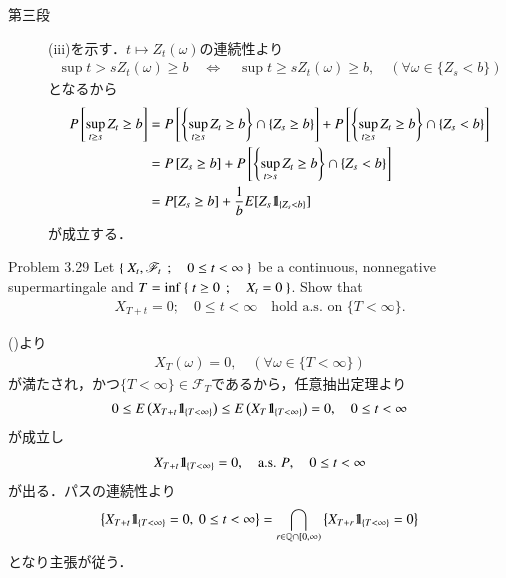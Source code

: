 \begin{prf}
\begin{description}
			\item[第三段]
				(iii)を示す．$t \longmapsto Z_t(\omega)$の連続性より
				\begin{align}
					\sup{t > s}{Z_t(\omega)} \geq b 
					\quad \Leftrightarrow \quad
					\sup{t \geq s}{Z_t(\omega)} \geq b,
					\quad (\forall \omega \in \{Z_s < b\})
				\end{align}
				となるから
				\begin{align}
					P\left[ \operatorname*{sup}_{t \geq s} Z_t \geq b \right]
					&= P\left[ \left\{ \operatorname*{sup}_{t \geq s} Z_t \geq b \right\} \cap \{Z_s \geq b\} \right]
						+ P\left[ \left\{ \operatorname*{sup}_{t \geq s} Z_t \geq b \right\} \cap \{Z_s < b\} \right] \\
					&= P\left[ Z_s \geq b \right]
						+ P\left[ \left\{ \operatorname*{sup}_{t > s} Z_t \geq b \right\} \cap \{Z_s < b\} \right] \\
					&= P[Z_s \geq b] + \frac{1}{b} E[Z_s \mbox{1}\hspace{-0.25em}\mbox{l}_{\{Z_s < b\}}]
				\end{align}
				が成立する．
				\QED
		\end{description}
	\end{prf}
	
	\begin{itembox}[l]{Problem 3.29}
		Let $\left\{\ X_t,\mathscr{F}_t\ \, ; \quad 0 \leq t < \infty\ \right\}$ be a continuous, nonnegative supermartingale
		and $T = \operatorname*{inf}_{} \left\{\ t \geq 0\ \, ; \quad X_t = 0\ \right\}$. Show that
		\begin{align}
			X_{T + t} = 0; \quad 0 \leq t < \infty \quad \mbox{hold a.s. on $\{T < \infty\}$}.
		\end{align}
	\end{itembox}
	
	\begin{prf}
		()より
		\begin{align}
			X_T(\omega) = 0,
			\quad (\forall \omega \in \{T < \infty\})
		\end{align}
		が満たされ，かつ$\{T < \infty\} \in \mathscr{F}_T$であるから，任意抽出定理より
		\begin{align}
			0 \leq E\left( X_{T+t} \mbox{1}\hspace{-0.25em}\mbox{l}_{\{T < \infty\}} \right) \leq E\left( X_T \mbox{1}\hspace{-0.25em}\mbox{l}_{\{T < \infty\}} \right) = 0,
			\quad 0 \leq t < \infty
		\end{align}
		が成立し
		\begin{align}
			X_{T+t} \mbox{1}\hspace{-0.25em}\mbox{l}_{\{T < \infty\}} = 0,
			\quad \mbox{a.s. $P$},
			\quad 0 \leq t < \infty
		\end{align}
		が出る．パスの連続性より
		\begin{align}
			\left\{ X_{T+t} \mbox{1}\hspace{-0.25em}\mbox{l}_{\{T < \infty\}} = 0,\ 0 \leq t < \infty \right\}
			= \bigcap_{r \in \mathbb{Q} \cap [0,\infty)} \left\{ X_{T+r} \mbox{1}\hspace{-0.25em}\mbox{l}_{\{T < \infty\}} = 0 \right\}
		\end{align}
		となり主張が従う．
		\QED
	\end{prf}
	
